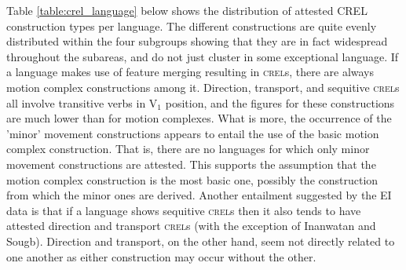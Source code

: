 Table \ref{table:crel_language} below shows the distribution of attested CREL construction types per language. The different constructions are quite evenly distributed within the four subgroups showing that they are in fact widespread throughout the subareas, and do not just cluster in some exceptional language. If a language makes use of feature merging resulting in \textsc{crel}s, there are always motion complex constructions among it. Direction, transport, and sequitive \textsc{crel}s all involve transitive verbs in V$_1$ position, and the figures for these constructions are much lower than for motion complexes. What is more, the occurrence of the 'minor' movement constructions appears to entail the use of the basic motion complex construction. That is, there are no languages for which only minor movement constructions are attested. This supports the assumption that the motion complex construction is the most basic one, possibly the construction from which the minor ones are derived. Another entailment suggested by the EI data is that if a language shows sequitive \textsc{crel}s then it also tends to have attested direction and transport \textsc{crel}s (with the exception of Inanwatan and Sougb). Direction and transport, on the other hand, seem not directly related to one another as either construction may occur without the other.

